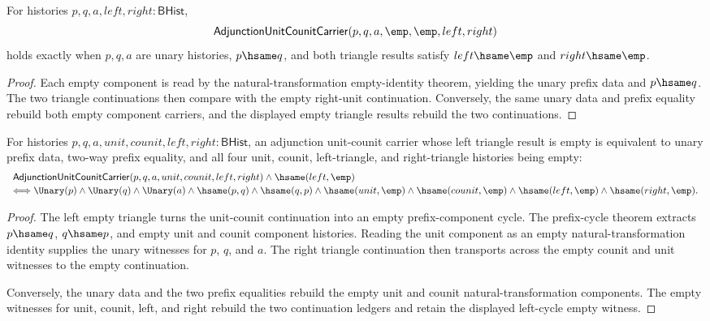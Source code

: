\begin{theorem}
\label{thm:adjunction-unit-counit-empty-components-exactness}
For histories $p,q,a,left,right:\mathsf{BHist}$,
$$
\mathsf{AdjunctionUnitCounitCarrier}(p,q,a,\emp,\emp,left,right)
$$
holds exactly when $p,q,a$ are unary histories, $p \hsame q$, and both triangle
results satisfy $left \hsame \emp$ and $right \hsame \emp$.
\end{theorem}
\begin{proof}
Each empty component is read by the natural-transformation empty-identity
theorem, yielding the unary prefix data and $p \hsame q$. The two triangle
continuations then compare with the empty right-unit continuation. Conversely,
the same unary data and prefix equality rebuild both empty component carriers,
and the displayed empty triangle results rebuild the two continuations.
\end{proof}

\begin{theorem}
\label{thm:adjunction-unit-counit-left-cycle-empty-components}
For histories $p,q,a,unit,counit,left,right:\mathsf{BHist}$,
an adjunction unit-counit carrier whose left triangle result is empty is
equivalent to unary prefix data, two-way prefix equality, and all four
unit, counit, left-triangle, and right-triangle histories being empty:
$$
\begin{array}{l}
\mathsf{AdjunctionUnitCounitCarrier}(p,q,a,unit,counit,left,right)
\land \hsame(left,\emp)\\[2pt]
\Longleftrightarrow
\Unary(p)\land\Unary(q)\land\Unary(a)\land
\hsame(p,q)\land\hsame(q,p)\land
\hsame(unit,\emp)\land\hsame(counit,\emp)\land
\hsame(left,\emp)\land\hsame(right,\emp).
\end{array}
$$
\end{theorem}
\begin{proof}
The left empty triangle turns the unit-counit continuation into an empty
prefix-component cycle. The prefix-cycle theorem extracts $p\hsame q$,
$q\hsame p$, and empty unit and counit component histories. Reading the unit
component as an empty natural-transformation identity supplies the unary
witnesses for $p$, $q$, and $a$. The right triangle continuation then
transports across the empty counit and unit witnesses to the empty
continuation.

Conversely, the unary data and the two prefix equalities rebuild the empty
unit and counit natural-transformation components. The empty witnesses for
unit, counit, left, and right rebuild the two continuation ledgers and retain
the displayed left-cycle empty witness.
\end{proof}

